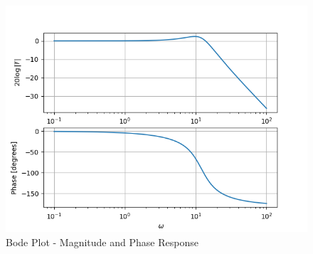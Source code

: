 \documentclass[journal,12pt,twocolumn]{IEEEtran}
\theoremstyle{remark}
\begin{document}
\begin{figure}[h]
    \centering  

\includegraphics[width=\columnwidth]{figs/plot.png}

    \centering
    \caption{Bode Plot - Magnitude and Phase Response}

    \label{fig:}
\end{figure}
\end{document}

